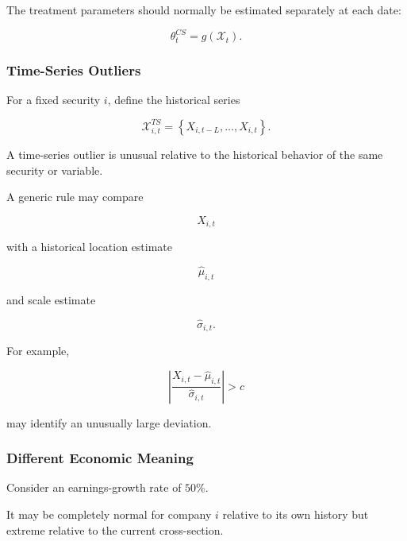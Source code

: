 \documentclass[11pt,a4paper]{article}
\begin{document}
The treatment parameters should normally be estimated separately at each date:

\begin{equation}
\boxed{
\theta_t^{CS}
=
g
\left(
\mathcal{X}_t
\right).
}
\end{equation}


\subsubsection{Time-Series Outliers}

For a fixed security $i$, define the historical series

\begin{equation}
\mathcal{X}_{i,t}^{TS}
=
\left\{
X_{i,t-L},
\ldots,
X_{i,t}
\right\}.
\end{equation}

A time-series outlier is unusual relative to the historical behavior of the
same security or variable.

A generic rule may compare

\begin{equation}
X_{i,t}
\end{equation}

with a historical location estimate

\begin{equation}
\widehat{\mu}_{i,t}
\end{equation}

and scale estimate

\begin{equation}
\widehat{\sigma}_{i,t}.
\end{equation}

For example,

\begin{equation}
\left|
\frac{
X_{i,t}-\widehat{\mu}_{i,t}
}{
\widehat{\sigma}_{i,t}
}
\right|
>
c
\end{equation}

may identify an unusually large deviation.


\subsubsection{Different Economic Meaning}

Consider an earnings-growth rate of $50\%$.

It may be completely normal for company $i$ relative to its own history but
extreme relative to the current cross-section.
\end{document}
